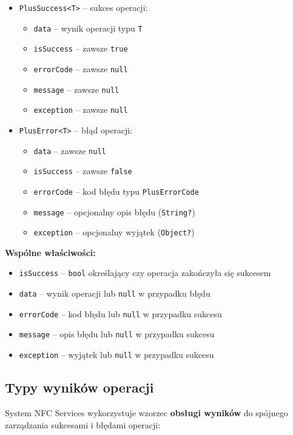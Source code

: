 \documentclass[a4paper,12pt]{article}
\begin{document}
\begin{itemize}
    \item \texttt{PlusSuccess<T>} -- sukces operacji:
    \begin{itemize}
        \item \texttt{data} -- wynik operacji typu \texttt{T}
        \item \texttt{isSuccess} -- zawsze \texttt{true}
        \item \texttt{errorCode} -- zawsze \texttt{null}
        \item \texttt{message} -- zawsze \texttt{null}
        \item \texttt{exception} -- zawsze \texttt{null}
    \end{itemize}
    \item \texttt{PlusError<T>} -- błąd operacji:
    \begin{itemize}
        \item \texttt{data} -- zawsze \texttt{null}
        \item \texttt{isSuccess} -- zawsze \texttt{false}
        \item \texttt{errorCode} -- kod błędu typu \texttt{PlusErrorCode}
        \item \texttt{message} -- opcjonalny opis błędu (\texttt{String?})
        \item \texttt{exception} -- opcjonalny wyjątek (\texttt{Object?})
    \end{itemize}
\end{itemize}

\textbf{Wspólne właściwości:}
\begin{itemize}
    \item \texttt{isSuccess} -- \texttt{bool} określający czy operacja zakończyła się sukcesem
    \item \texttt{data} -- wynik operacji lub \texttt{null} w przypadku błędu
    \item \texttt{errorCode} -- kod błędu lub \texttt{null} w przypadku sukcesu
    \item \texttt{message} -- opis błędu lub \texttt{null} w przypadku sukcesu
    \item \texttt{exception} -- wyjątek lub \texttt{null} w przypadku sukcesu
\end{itemize}

\newpage

\subsection{Typy wyników operacji}
System NFC Services wykorzystuje wzorzec \textbf{obsługi wyników} do spójnego zarządzania sukcesami i błędami operacji:
\end{document}
